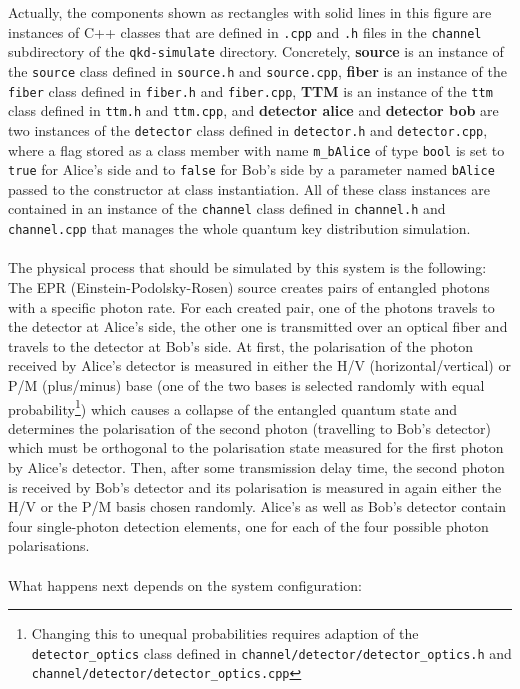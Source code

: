 Actually, the components shown as rectangles with solid lines in this figure are instances of C++ classes that are defined in \texttt{.cpp} and \texttt{.h} files in the \texttt{channel} subdirectory of the \texttt{qkd-simulate} directory. Concretely, \textbf{source} is an instance of the \texttt{source} class defined in \texttt{source.h} and \texttt{source.cpp}, \textbf{fiber} is an instance of the \texttt{fiber} class defined in \texttt{fiber.h} and \texttt{fiber.cpp}, \textbf{TTM} is an instance of the \texttt{ttm} class defined in \texttt{ttm.h} and \texttt{ttm.cpp}, and \textbf{detector alice} and \textbf{detector bob} are two instances of the \texttt{detector} class defined in \texttt{detector.h} and \texttt{detector.cpp}, where a flag stored as a class member with name \texttt{m\_bAlice} of type \texttt{bool} is set to \texttt{true} for Alice's side and to \texttt{false} for Bob's side by a parameter named \texttt{bAlice} passed to the constructor at class instantiation. All of these class instances 
are contained in an instance of the \texttt{channel} class defined in \texttt{channel.h} and \texttt{channel.cpp} that manages the whole quantum key distribution simulation.
\\
\\
The physical process that should be simulated by this system is the following: The EPR (Einstein-Podolsky-Rosen) source creates pairs of entangled photons with a specific photon rate. For each created pair, one of the photons travels to the detector at Alice's side, the other one is transmitted over an optical fiber and travels to the detector at Bob's side. At first, the polarisation of the photon received by Alice's detector is measured in either the H/V (horizontal/vertical) or P/M (plus/minus) base (one of the two bases is selected randomly with equal probability\footnote{Changing this to unequal probabilities requires adaption of the \texttt{detector\_optics} class defined in \texttt{channel/detector/detector\_optics.h} and \texttt{channel/detector/detector\_optics.cpp}}) which causes a collapse of the entangled quantum state and determines the polarisation of the second photon (travelling to Bob's detector) which must be orthogonal to the polarisation state measured for the first photon by Alice's 
detector. Then, after some transmission delay time, the second photon is received by Bob's detector and its polarisation is measured in again either the H/V or the P/M basis chosen randomly. Alice's as well as Bob's detector contain four single-photon detection elements, one for each of the four possible photon polarisations.
\\
\\
What happens next depends on the system configuration:

